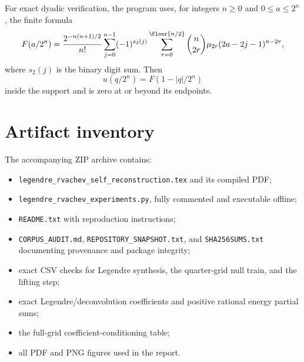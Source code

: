 \documentclass[11pt,oneside]{article}
\numberwithin{equation}{section}
\theoremstyle{definition}
\theoremstyle{remark}
\begin{document}
For exact dyadic verification, the program uses, for integers $n\ge0$ and
$0\le a\le2^n$, the finite formula
\begin{equation}
 F(a/2^n)=\frac{2^{-n(n+1)/2}}{n!}
 \sum_{j=0}^{a-1}(-1)^{s_2(j)}
 \sum_{r=0}^{\Floor{n/2}}
 \binom{n}{2r}\mu_{2r}(2a-2j-1)^{n-2r},
 \label{eq:dyadic-F}
\end{equation}
where $s_2(j)$ is the binary digit sum.  Then
\begin{equation}
 u(q/2^n)=F(1-|q|/2^n)
 \label{eq:dyadic-up}
\end{equation}
inside the support and is zero at or beyond its endpoints.

\section{Artifact inventory}
\label{app:inventory}

The accompanying ZIP archive contains:
\begin{itemize}
 \item \texttt{legendre\_rvachev\_self\_reconstruction.tex} and its compiled
 PDF;
 \item \texttt{legendre\_rvachev\_experiments.py}, fully commented and
 executable offline;
 \item \texttt{README.txt} with reproduction instructions;
 \item \texttt{CORPUS\_AUDIT.md}, \texttt{REPOSITORY\_SNAPSHOT.txt}, and
 \texttt{SHA256SUMS.txt} documenting provenance and package integrity;
 \item exact CSV checks for Legendre synthesis, the quarter-grid null train,
 and the lifting step;
 \item exact Legendre/deconvolution coefficients and positive rational energy
 partial sums;
 \item the full-grid coefficient-conditioning table;
 \item all PDF and PNG figures used in the report.
\end{itemize}
\end{document}
